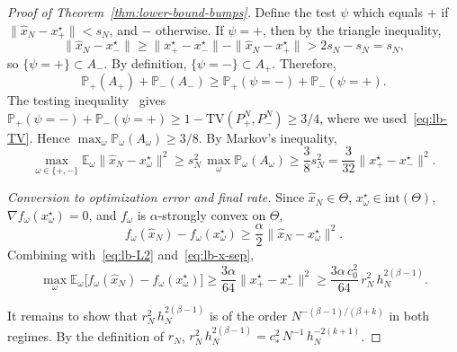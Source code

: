 \documentclass{article}
\renewcommand{\geq}{\geqslant}
\renewcommand{\hat}{\widehat}
\theoremstyle{definition}
\begin{document}
\begin{proof}[Proof of Theorem~\ref{thm:lower-bound-bumps}]
Define the test $\psi$ which equals $+$ if 
$\|\hat{x}_N-x_+^\star\|<s_N$, and $-$ otherwise. If $\psi=+$, 
then by the triangle inequality,
\[
\|\hat{x}_N-x_-^\star\|
\geq\|x_+^\star-x_-^\star\|-\|\hat{x}_N-x_+^\star\|
>2s_N-s_N=s_N,
\]
so $\{\psi=+\}\subset A_-$. By definition, 
$\{\psi=-\}\subset A_+$. Therefore,
\[
\mathbb{P}_+(A_+)+\mathbb{P}_-(A_-)
\geq\mathbb{P}_+(\psi=-)+\mathbb{P}_-(\psi=+).
\]
The testing 
inequality~\cite[Theorem~2.2]{tsybakov2009nonparametric} gives 
$\mathbb{P}_+(\psi=-)+\mathbb{P}_-(\psi=+)
\geq 1-\mathrm{TV}(P_+^N,P_-^N)\geq 3/4$, 
where we used~\eqref{eq:lb-TV}. Hence 
$\max_{\omega}\mathbb{P}_\omega(A_\omega)\geq 3/8$. By Markov's 
inequality,
\begin{equation}
\label{eq:lb-L2}
\max_{\omega\in\{+,-\}}\mathbb{E}_\omega\|\hat{x}_N-x_\omega^\star\|^2
\geq s_N^2\,\max_{\omega}\mathbb{P}_\omega(A_\omega)
\geq\frac{3}{8}s_N^2
=\frac{3}{32}\|x_+^\star-x_-^\star\|^2.
\end{equation}

\medskip
\noindent\textit{Conversion to optimization error and final rate.}
Since $\hat{x}_N\in\Theta$, $x_\omega^\star\in\mathrm{int}(\Theta)$, 
$\nabla f_\omega(x_\omega^\star)=0$, and $f_\omega$ is 
$\alpha$-strongly convex on $\Theta$,
\[
f_\omega(\hat{x}_N)-f_\omega(x_\omega^\star)
\geq\frac{\alpha}{2}\|\hat{x}_N-x_\omega^\star\|^2.
\]
Combining with~\eqref{eq:lb-L2} and~\eqref{eq:lb-x-sep},
\begin{equation}
\label{eq:lb-opt-error}
\max_{\omega}\mathbb{E}_\omega
\bigl[f_\omega(\hat{x}_N)-f_\omega(x_\omega^\star)\bigr]
\geq\frac{3\alpha}{64}\|x_+^\star-x_-^\star\|^2
\geq\frac{3\alpha\,c_0^2}{64}\,r_N^2\,h_N^{2(\beta-1)}.
\end{equation}

It remains to show that $r_N^2\,h_N^{2(\beta-1)}$ is of the order 
$N^{-(\beta-1)/(\beta+k)}$ in both regimes. By the definition 
of $r_N$, 
$r_N^2\,h_N^{2(\beta-1)}=c_*^2\,N^{-1}\,h_N^{-2(k+1)}$.


\end{proof}
\end{document}

